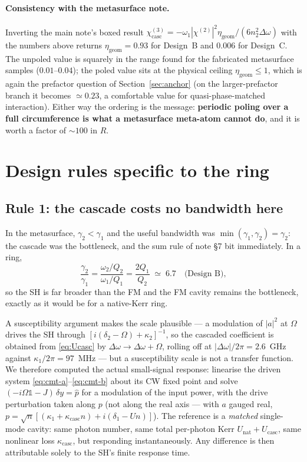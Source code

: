 \documentclass[11pt,a4paper]{article}
\newcommand{\chitwo}{\chi^{(2)}}
\newcommand{\chithree}{\chi^{(3)}}
\newcommand{\Dom}{\Delta\omega}
\newcommand{\Ucasc}{U_{\text{casc}}}
\newcommand{\Unat}{U_{\text{nat}}}
\newcommand{\kcasc}{\kappa_{\text{casc}}}
\begin{document}
\paragraph{Consistency with the metasurface note.}  Inverting the main
note's boxed result
$\chithree_{\text{casc}}=-\omega_1|\chitwo|^2\eta_{\text{geom}}/(6n_2^2\Dom)$
with the numbers above returns $\eta_{\text{geom}}=0.93$ for Design~B
and $0.006$ for Design~C.  The unpoled value is squarely in the range
found for the fabricated metasurface samples ($0.01$--$0.04$); the
poled value sits at the physical ceiling $\eta_{\text{geom}}\le1$, which
is again the prefactor question of Section~\ref{sec:anchor} (on the
larger-prefactor branch it becomes $\simeq0.23$, a comfortable value for
quasi-phase-matched interaction).  Either way the ordering is the
message: \textbf{periodic poling over a full circumference is what a
metasurface meta-atom cannot do}, and it is worth a factor of $\sim100$
in $R$.

\section{Design rules specific to the ring}\label{sec:rules}

\subsection{Rule 1: the cascade costs no bandwidth here}\label{sec:rule1}

In the metasurface, $\gamma_2<\gamma_1$ and the useful bandwidth was
$\min(\gamma_1,\gamma_2)=\gamma_2$: the cascade was the bottleneck, and
the sum rule of note \S7 bit immediately.  In a ring,
\begin{equation}
  \frac{\gamma_2}{\gamma_1}=\frac{\omega_2/Q_2}{\omega_1/Q_1}
     =\frac{2Q_1}{Q_2}\;\simeq\;6.7\quad\text{(Design B)} ,
\end{equation}
so the SH is far broader than the FM and the FM cavity remains the
bottleneck, exactly as it would be for a native-Kerr ring.

A susceptibility argument makes the scale plausible --- a modulation of
$|a|^2$ at $\Omega$ drives the SH through
$[i(\delta_2-\Omega)+\kappa_2]^{-1}$, so the cascaded coefficient is
obtained from \eqref{eq:Ucasc} by $\Dom\to\Dom+\Omega$, rolling off at
$|\Dom|/2\pi=2.6$~GHz against $\kappa_1/2\pi=97$~MHz --- but a
susceptibility scale is not a transfer function.  We therefore computed
the actual small-signal response: linearise the driven system
\eqref{eq:cmt-a}--\eqref{eq:cmt-b} about its CW fixed point and solve
$(-i\Omega\mathbb{1}-J)\,\delta y=\hat p$ for a modulation of the input
power, with the drive perturbation taken along $p$ (not along the real
axis --- with $a$ gauged real, $p=\sqrt n[(\kappa_1+\kcasc n)
+i(\delta_1-Un)]$).  The reference is a \emph{matched} single-mode
cavity: same photon number, same total per-photon Kerr
$\Unat+\Ucasc$, same nonlinear loss $\kcasc$, but responding
instantaneously.  Any difference is then attributable solely to the
SH's finite response time.
\end{document}
